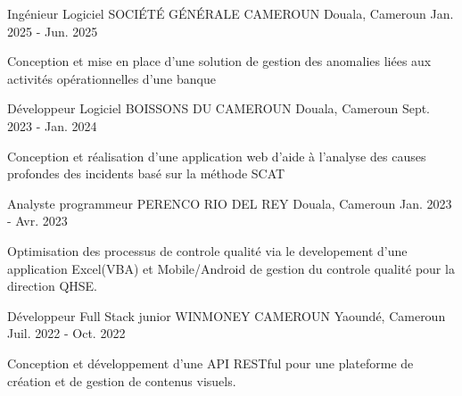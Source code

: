 

\begin{cventries}

  \cventry
    {Ingénieur Logiciel} %
    {SOCI\'ET\'E G\'EN\'ERALE CAMEROUN} %
    {Douala, Cameroun} %
    {Jan. 2025 - Jun. 2025} %
    {
      \begin{cvitems} %
        \item {Conception et mise en place d'une solution de gestion des anomalies liées aux activités opérationnelles d'une banque}
      \end{cvitems}
    }

  \cventry
    {Développeur Logiciel} %
    {BOISSONS DU CAMEROUN} %
    {Douala, Cameroun} %
    {Sept. 2023 - Jan. 2024} %
    {
      \begin{cvitems} %
        \item {Conception et réalisation d'une application web d'aide à l'analyse des causes profondes des incidents basé sur la méthode SCAT}
      \end{cvitems}
    }

  \cventry
    {Analyste programmeur} %
    {PERENCO RIO DEL REY} %
    {Douala, Cameroun} %
    {Jan. 2023 - Avr. 2023} %
    {
      \begin{cvitems} %
        \item {Optimisation des processus de controle qualité via le developement d'une application Excel(VBA) et Mobile/Android de gestion du controle qualité pour la direction QHSE.}
      \end{cvitems}
    }

  \cventry
    {Développeur Full Stack junior} %
    {WINMONEY CAMEROUN} %
    {Yaoundé, Cameroun} %
    {Juil. 2022 - Oct. 2022} %
    {
      \begin{cvitems} %
        \item {Conception et développement d'une API RESTful pour une plateforme de création et de gestion de contenus visuels.}
      \end{cvitems}
    }


\end{cventries}
